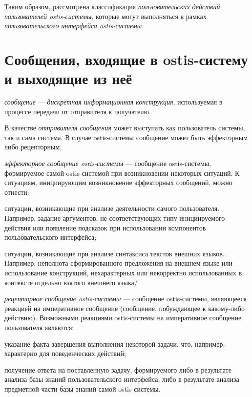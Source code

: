 Таким образом, рассмотрена классификация \textit{пользовательских действий пользователей ostis-системы}, которые могут выполняться в рамках \textit{пользовательского интерфейса ostis-системы}.

\section{Сообщения, входящие в ostis-систему и выходящие из неё}
\label{sec_messages}

\textit{сообщение} --- \textit{дискретная информационная конструкция}, используемая в процессе передачи от отправителя к получателю.

В качестве \textit{отправителя сообщения} может выступать как пользователь системы, так и сама система. В случае ostis-системы сообщение может быть эффекторным либо рецепторным.

\textit{эффекторное сообщение ostis-системы} --- сообщение ostis-системы, формируемое самой ostis-системой при возникновении некоторых ситуаций. К ситуациям, инициирующим возникновение эффекторных сообщений, можно отнести:
\begin{textitemize}
	\item ситуации, возникающие при анализе деятельности самого пользователя. Например, задание аргументов, не соответствующих типу инициируемого действия или появление подсказок при использовании компонентов пользовательского интерфейса;
	\item ситуации, возникающие при анализе синтаксиса текстов внешних языков. Например, неполнота сформированного предложения на внешнем языке или использование конструкций, нехарактерных или некорректно использованных в контексте отдельно взятого внешнего языка/
\end{textitemize}

\textit{рецепторное сообщение ostis-системы} --- сообщение ostis-системы, являющееся реакцией на императивное сообщение (сообщение, побуждающее к какому-либо действию). Возможными реакциями ostis-системы на императивное сообщение пользователя являются:
\begin{textitemize}
	\item указание факта завершения выполнения некоторой задачи, что, например, характерно для поведенческих действий;
	\item получение ответа на поставленную задачу, формируемого либо в результате анализа базы знаний пользовательского интерфейса, либо в результате анализа предметной части базы знаний самой ostis-системы.
\end{textitemize}

